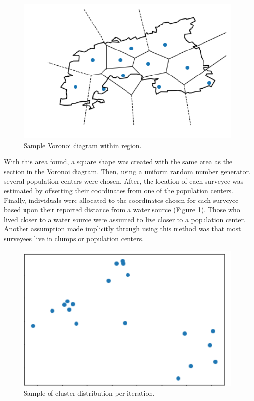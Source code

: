 \begin{figure}[h]
    \includegraphics[width=\linewidth]{figures/voronoi.png}
    \caption{Sample Voronoi diagram within region.}
    \label{fig:voronoi}
\end{figure}

With this area found, a square shape was created with the same area as the section in the Voronoi diagram. Then, using a uniform random number generator, several population centers were chosen. 
After, the location of each surveyee was estimated by offsetting their coordinates from one of the population centers. 
Finally, individuals were allocated to the coordinates chosen for each surveyee based upon their reported distance from a water source (Figure 1). 
Those who lived closer to a water source were assumed to live closer to a population center.   
Another assumption made implicitly through using this method was that most surveyees live in clumps or population centers.

\begin{figure}[h]
    \includegraphics[width=\linewidth]{figures/clusters.png}
    \caption{Sample of cluster distribution per iteration.}
    \label{fig:clusters}
\end{figure}

